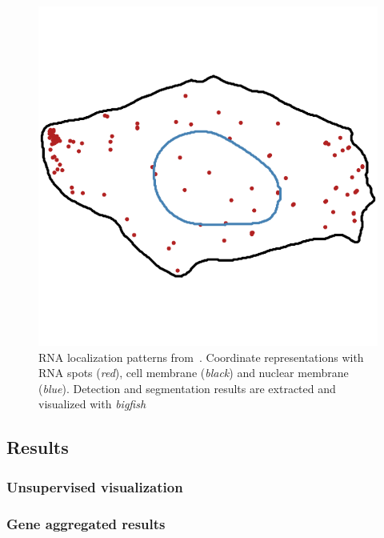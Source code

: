 \begin{figure}[h]
	\endminipage\hfill
		\includegraphics[width=\linewidth]{figures/introduction/real_coord_protrusion}
	\endminipage
	\caption{RNA localization patterns from~\cite{CHOUAIB_2020}.
	Coordinate representations with RNA spots (\textit{red}), cell membrane (\textit{black}) and nuclear membrane (\textit{blue}).
	Detection and segmentation results are extracted and visualized with \emph{bigfish}}
	\label{fig:localization_patterns_racha_features}
\end{figure}

\subsection{Results}
\label{subsec:results_general_pattern}

\subsubsection{Unsupervised visualization}

\subsubsection{Gene aggregated results}

